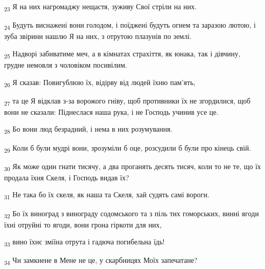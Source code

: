 \begin{tcolorbox}
\textsubscript{23} Я на них нагромаджу нещастя, зуживу Свої стріли на них.
\end{tcolorbox}
\begin{tcolorbox}
\textsubscript{24} Будуть виснажені вони голодом, і поїджені будуть огнем та заразою лютою, і зуба звірини нашлю Я на них, з отрутою плазунів по землі.
\end{tcolorbox}
\begin{tcolorbox}
\textsubscript{25} Надворі забиватиме меч, а в кімнатах страхіття, як юнака, так і дівчину, грудне немовля з чоловіком посивілим.
\end{tcolorbox}
\begin{tcolorbox}
\textsubscript{26} Я сказав: Повигублюю їх, відірву від людей їхню пам'ять,
\end{tcolorbox}
\begin{tcolorbox}
\textsubscript{27} та це Я відклав з-за ворожого гніву, щоб противники їх не згордилися, щоб вони не сказали: Піднеслася наша рука, і не Господь учинив усе це.
\end{tcolorbox}
\begin{tcolorbox}
\textsubscript{28} Бо вони люд безрадний, і нема в них розумування.
\end{tcolorbox}
\begin{tcolorbox}
\textsubscript{29} Коли б були мудрі вони, зрозуміли б оце, розсудили б були про кінець свій.
\end{tcolorbox}
\begin{tcolorbox}
\textsubscript{30} Як може один гнати тисячу, а два проганять десять тисяч, коли то не те, що їх продала їхня Скеля, і Господь видав їх?
\end{tcolorbox}
\begin{tcolorbox}
\textsubscript{31} Не така бо їх скеля, як наша та Скеля, хай судять самі вороги.
\end{tcolorbox}
\begin{tcolorbox}
\textsubscript{32} Бо їх виноград з винограду содомського та з піль тих гоморських, винні ягоди їхні отруйні то ягоди, вони грона гіркоти для них,
\end{tcolorbox}
\begin{tcolorbox}
\textsubscript{33} вино їхнє зміїна отрута і гадюча погибельна їдь!
\end{tcolorbox}
\begin{tcolorbox}
\textsubscript{34} Чи замкнене в Мене не це, у скарбницях Моїх запечатане?
\end{tcolorbox}
